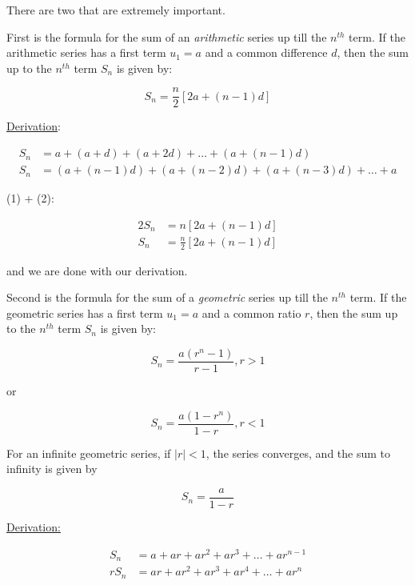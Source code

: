 \documentclass[12pt, a4paper, titlepage]{article}
\begin{document}
There are two that are extremely important.

First is the formula for the sum of an \emph{arithmetic} series up till the $n^{th}$ term. If the arithmetic series has a first term $u_1 = a$ and a common difference $d$, then the sum up to the $n^{th}$ term $S_n$ is given by:

\begin{equation*}
    S_n = \frac{n}{2}[2a + (n-1)d]
\end{equation*}

\underline{Derivation}:

\begin{align}
    S_n &= a + (a + d) + (a + 2d) + \dots + (a + (n-1)d) \\
    S_n &= (a + (n-1)d) + (a + (n-2)d) + (a + (n-3)d) + \dots + a
\end{align}

(1) + (2):

\begin{align}
    2S_n &= n[2a + (n-1)d] \\
    S_n &= \frac{n}{2}[2a + (n-1)d]
\end{align}

and we are done with our derivation.

Second is the formula for the sum of a \emph{geometric} series up till the $n^{th}$ term. If the geometric series has a first term $u_1 = a$ and a common ratio $r$, then the sum up to the $n^{th}$ term $S_n$ is given by:

\begin{equation*}
    S_n = \frac{a(r^n - 1)}{r - 1}, r > 1
\end{equation*}

or

\begin{equation*}
    S_n = \frac{a(1 - r^n)}{1 - r}, r < 1
\end{equation*}

For an infinite geometric series, if $|r| < 1$, the series converges, and the sum to infinity is given by

\begin{equation*}
    S_n = \frac{a}{1-r}
\end{equation*}

\underline{Derivation:}

\begin{align}
    S_n &= a + ar + ar^2 + ar^3 + \dots + ar^{n-1} \\
    rS_n &= ar + ar^2 + ar^3 + ar^4 + \dots + ar^n
\end{align}
\end{document}
